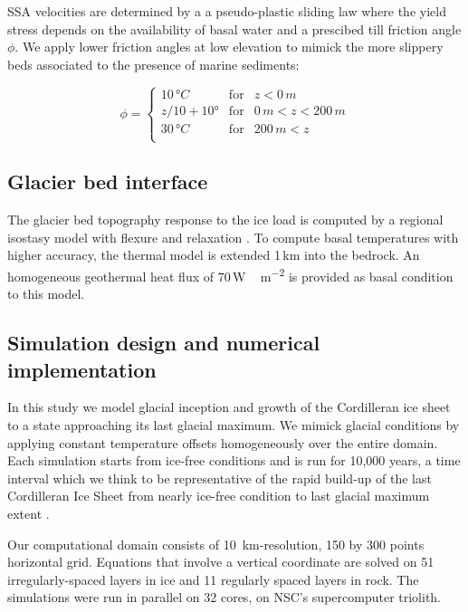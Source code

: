 SSA velocities are determined by a a pseudo-plastic sliding law where the yield stress depends on the availability of basal water and a prescibed till friction angle$\phi$. We apply lower friction angles at low elevation to mimick the more slippery beds associated to the presence of marine sediments:

\begin{equation}
	\phi = \left\{\begin{array}{llc}
		10\,\unit{\degree C} & \mathrm{for} &               z<  0\,\unit{m} \\
		z/10 + 10°           & \mathrm{for} &   0\,\unit{m}<z<200\,\unit{m} \\
		30\,\unit{\degree C} & \mathrm{for} & 200\,\unit{m}<z               \\
	\end{array}\right.
\end{equation}

\subsection{Glacier bed interface}

The glacier bed topography response to the ice load is computed by a regional isostasy model with flexure and relaxation \citep{lingle-clark-1985}. To compute basal temperatures with higher accuracy, the thermal model is extended 1\,km into the bedrock. An homogeneous geothermal heat flux of 70\,\unit{W\,m^{-2}} is provided as basal condition to this model.

\subsection{Simulation design and numerical implementation}

In this study we model glacial inception and growth of the Cordilleran ice sheet to a state approaching its last glacial maximum. We mimick glacial conditions by applying constant temperature offsets homogeneously over the entire domain. Each simulation starts from ice-free conditions and is run for 10,000 years, a time interval which we think to be representative of the rapid build-up of the last Cordilleran Ice Sheet from nearly ice-free condition to last glacial maximum extent \needref.

Our computational domain consists of 10~km-resolution, 150 by 300 points horizontal grid. Equations that involve a vertical coordinate are solved on 51 irregularly-spaced layers in ice and 11 regularly spaced layers in rock. The simulations were run in parallel on 32 cores, on NSC's supercomputer triolith\needref.

